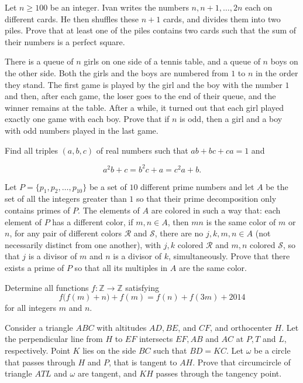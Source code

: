 \documentclass[11pt]{scrartcl}
\begin{document}
\begin{problem}[258585206260584]
Let $n \geqslant 100$ be an integer. Ivan writes the numbers $n, n+1, \ldots, 2 n$ each on different cards. He then shuffles these $n+1$ cards, and divides them into two piles. Prove that at least one of the piles contains two cards such that the sum of their numbers is a perfect square.
\end{problem}
\begin{problem}[259897104343709]
	There is a queue of $n{}$ girls on one side of a tennis table, and a queue of $n{}$ boys on the other side. Both the girls and the boys are numbered from $1{}$ to $n{}$ in the order they stand. The first game is played by the girl and the boy with the number $1{}$ and then, after each game, the loser goes to the end of their queue, and the winner remains at the table. After a while, it turned out that each girl played exactly one game with each boy. Prove that if $n{}$ is odd, then a girl and a boy with odd numbers played in the last game.
\end{problem}
\begin{problem}[260347681948452]
Find all triples $(a, b, c)$ of real numbers such that $ab + bc + ca = 1$ and

$$a^2b + c = b^2c + a = c^2a + b.$$
\end{problem}
\begin{problem}[261061984301321]
Let $P = \{p_1,p_2,\ldots, p_{10}\}$ be a set of $10$ different prime numbers and let $A$ be the set of all the integers greater than $1$ so that their prime decomposition only contains primes of $P$. The elements of $A$ are colored in such a way that:
each element of $P$ has a different color,
if $m,n \in A$, then $mn$ is the same color of $m$ or $n$,
for any pair of different colors $\mathcal{R}$ and $\mathcal{S}$, there are no $j,k,m,n\in A$ (not necessarily distinct from one another), with $j,k$ colored $\mathcal{R}$ and $m,n$ colored $\mathcal{S}$, so that $j$ is a divisor of $m$ and $n$ is a divisor of $k$, simultaneously.
Prove that there exists a prime of $P$ so that all its multiples in $A$ are the same color.
\end{problem}
\begin{problem}[262105369827306]
	Determine all functions $f: \mathbb{Z}\to\mathbb{Z}$ satisfying\[f\big(f(m)+n\big)+f(m)=f(n)+f(3m)+2014\]for all integers $m$ and $n$.
\end{problem}
\begin{problem}[263704170707884]
	Consider a triangle $ABC$ with altitudes $AD, BE$, and $CF$, and orthocenter $H$. Let the perpendicular line from $H$ to $EF$ intersects $EF, AB$ and $AC$ at $P, T$ and $L$, respectively. Point $K$ lies on the side $BC$ such that $BD=KC$. Let $\omega$ be a circle that passes through $H$ and $P$, that is tangent to $AH$. Prove that circumcircle of triangle $ATL$ and $\omega$ are tangent, and $KH$ passes through the tangency point.
\end{problem}
\end{document}
